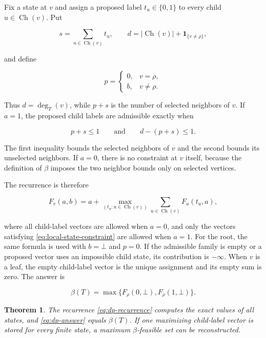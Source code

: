 \documentclass[11pt,a4paper]{article}
\newtheorem{theorem}{Theorem}[section]
\numberwithin{equation}{section}
\begin{document}
Fix a state at \(v\) and assign a proposed label \(t_u\in\{0,1\}\) to
every child \(u\in\operatorname{Ch}(v)\). Put

\[
s=\sum_{u\in\operatorname{Ch}(v)}t_u,
\qquad
d=|\operatorname{Ch}(v)|+\mathbf 1_{\{v\ne\rho\}},
\]

and define

\[
p=
\begin{cases}
0,&v=\rho,\\
b,&v\ne\rho.
\end{cases}
\]

Thus \(d=\deg_T(v)\), while \(p+s\) is the number of selected neighbors
of \(v\). If \(a=1\), the proposed child labels are admissible exactly
when

\nopagebreak[4]
\begin{equation}\label{eq:local-state-constraint}
p+s\le 1
\qquad\text{and}\qquad
d-(p+s)\le 1.
\end{equation}

The first inequality bounds the selected neighbors of \(v\) and the
second bounds its unselected neighbors. If \(a=0\), there is no
constraint at \(v\) itself, because the definition of \(\beta\) imposes
the two neighbor bounds only on selected vertices.

The recurrence is therefore

\begin{equation}\label{eq:dp-recurrence}
F_v(a,b)
=a+
\max_{(t_u:u\in\operatorname{Ch}(v))}
\sum_{u\in\operatorname{Ch}(v)}F_u(t_u,a),
\end{equation}

where all child-label vectors are allowed when \(a=0\), and only the
vectors satisfying \eqref{eq:local-state-constraint} are allowed when \(a=1\). For the root, the
same formula is used with \(b=\bot\) and \(p=0\). If the admissible
family is empty or a proposed vector uses an impossible child state, its
contribution is \(-\infty\). When \(v\) is a leaf, the empty child-label
vector is the unique assignment and its empty sum is zero. The answer is

\begin{equation}\label{eq:dp-answer}
\beta(T)=\max\{F_\rho(0,\bot),F_\rho(1,\bot)\}.
\end{equation}

\begin{theorem}\label{thm:dp-correctness}
The recurrence \eqref{eq:dp-recurrence} computes the exact values of
all states, and \eqref{eq:dp-answer} equals \(\beta(T)\). If one maximizing child-label
vector is stored for every finite state, a maximum \(\beta\)-feasible
set can be reconstructed.
\end{theorem}
\end{document}
